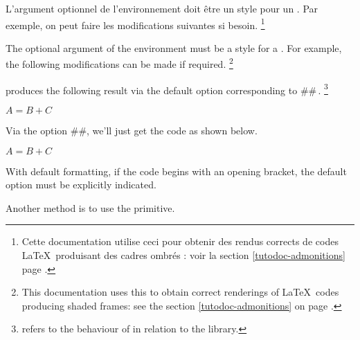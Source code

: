 \documentclass{tutodoc}
\begin{document}
\begin{tdocnote}
	L'argument optionnel de l'environnement  doit être un style pour un . Par exemple, on peut faire les modifications suivantes si besoin.%
	\footnote{
		Cette documentation utilise ceci pour obtenir des rendus corrects de codes \LaTeX\ produisant des cadres ombrés : voir la section \ref{tutodoc-admonitions} page \pageref{tutodoc-admonitions}.
	}

	The optional argument of the  environment must be a style for a . For example, the following modifications can be made if required.
	\footnote{
		This documentation uses this to obtain correct renderings of \LaTeX\ codes producing shaded frames: see the section \ref{tutodoc-admonitions} on page \pageref{tutodoc-admonitions}.
	}

\end{tdocnote}




\begin{tdocexa}[Following]
     produces the following result via the default option corresponding to \tdoclatexin##\,.
    \footnote{
         refers to the  behaviour of  in relation to the  library.
    }

    \begin{tdoclatex}
        $A = B + C$
    \end{tdoclatex}
\end{tdocexa}




\begin{tdocexa}
    Via the option \tdoclatexin##, we'll just get the code as shown below.

    \begin{tdoclatex}
        $A = B + C$
    \end{tdoclatex}
\end{tdocexa}




\begin{tdocwarn}
    With default formatting, if the code begins with an opening bracket, the default option must be explicitly indicated.

    \smallskip

    Another method is to use the  primitive.
\end{tdocwarn}
\end{document}
